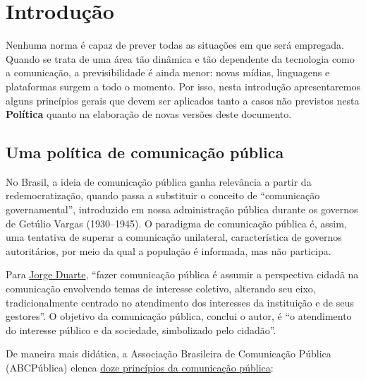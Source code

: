 \chapter{Introdução}

Nenhuma norma é capaz de prever todas as situações em que será empregada. Quando se trata de uma área tão dinâmica e tão dependente da
tecnologia como a comunicação, a previsibilidade é ainda menor: novas mídias, linguagens e plataformas surgem a todo o momento. Por isso,
nesta introdução apresentaremos alguns princípios gerais que devem ser aplicados tanto a casos não previstos nesta \textbf{Política} quanto na
elaboração de novas versões deste documento.

\section{Uma política de comunicação pública}

No Brasil, a ideia de comunicação pública ganha relevância a partir da redemocratização, quando passa a substituir o conceito de ``comunicação
governamental'', introduzido em nossa administração pública durante os governos de Getúlio Vargas (1930--1945). O paradigma de comunicação
pública é, assim, uma tentativa de superar a comunicação unilateral, característica de governos autoritários, por meio da qual a população é
informada, mas não participa.

Para
\href{https://abcpublica.org.br/wp-content/uploads/2021/02/Comunica\%C3\%A7\%C3\%A3o-P\%C3\%BAblica-VF-Cap\%C3\%ADtulo.pdf}{Jorge
	Duarte}, ``fazer comunicação pública é assumir a perspectiva cidadã na comunicação envolvendo temas de interesse coletivo, alterando seu eixo,
tradicionalmente centrado no atendimento dos interesses da instituição e de seus gestores''. O objetivo da comunicação pública, conclui o autor,
é ``o atendimento do interesse público e da sociedade, simbolizado pelo cidadão''.

De maneira mais didática, a Associação Brasileira de Comunicação Pública (ABCPública) elenca \href{https://abcpublica.org.br/conheca-os-12-principios-da-comunicacao-publica/}{doze
	princípios da comunicação pública}:

